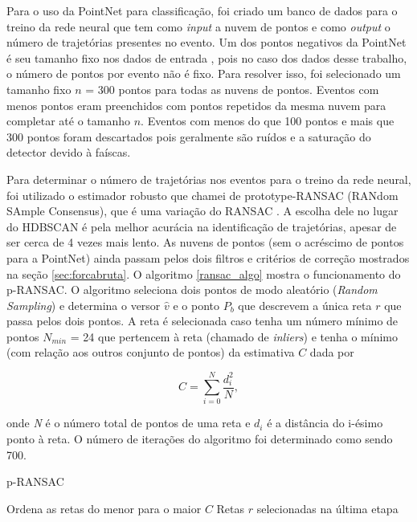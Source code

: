 \documentclass[a4paper,12pt,oneside]{book}
\begin{document}
\par  Para o uso da PointNet para classificação, foi criado um banco de dados para o treino da rede neural que tem como \textit{input} a nuvem de pontos e como \textit{output} o número de trajetórias presentes no evento. Um dos pontos negativos da PointNet é seu tamanho fixo nos dados de entrada \cite{qi2016pointnet}, pois no caso dos dados desse trabalho, o número de pontos por evento não é  fixo. Para resolver isso, foi selecionado um tamanho fixo $n$ = 300 pontos para todas as nuvens de pontos. Eventos com menos pontos eram preenchidos com pontos repetidos da mesma nuvem para completar até o tamanho $n$. Eventos com menos do que 100 pontos e mais que 300 pontos foram descartados pois geralmente são ruídos e a saturação do detector devido à faíscas.

\par Para determinar o número de trajetórias nos eventos para o treino da rede neural, foi utilizado o estimador robusto que chamei de prototype-RANSAC (RANdom SAmple Consensus), que é uma variação do RANSAC  \cite{ransac, artigo}. A escolha dele no lugar do HDBSCAN é pela melhor acurácia na identificação de trajetórias, apesar de ser cerca de 4 vezes mais lento. As nuvens de pontos (sem o acréscimo de pontos para a PointNet) ainda passam pelos dois filtros e critérios de correção mostrados na seção \ref{sec:forcabruta}. O algoritmo \ref{ransac_algo} mostra o funcionamento do p-RANSAC. O algoritmo seleciona dois pontos de modo aleatório (\textit{Random Sampling}) e determina o versor $\hat{v}$ e o ponto $P_b$ que descrevem a única reta $r$ que passa pelos dois pontos. A reta é selecionada caso tenha um número mínimo de pontos $N_{min}$ = 24 que pertencem à reta (chamado de \textit{inliers}) e tenha o mínimo (com relação aos outros conjunto de pontos) da estimativa $C$ dada por \cite{artigo}

\begin{equation} \label{criterio_ransac}
    C = \sum_{i = 0}^{N} \frac{d_i ^2}{N},
\end{equation}

onde \textit{N} é o número total de pontos de uma reta e $d_i$ é a distância do i-ésimo ponto à reta. O número de iterações do algoritmo foi determinado como sendo 700.

\begin{algorithm}[H]
    \caption{p-RANSAC}\label{ransac_algo}
    Ordena as retas do menor para o maior $C$\;
    \Return Retas $r$ selecionadas na última etapa\;
\end{algorithm}
\end{document}
